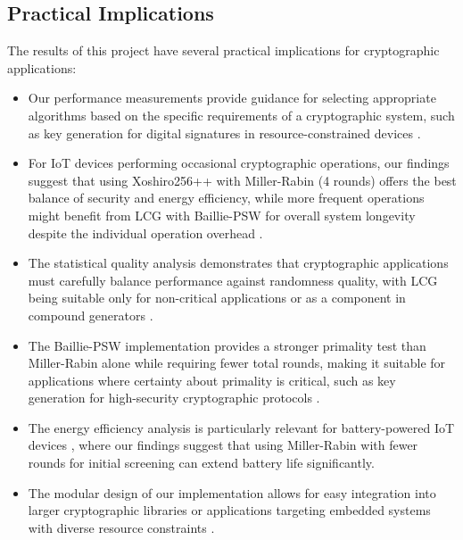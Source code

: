 \subsection{Practical Implications}

The results of this project have several practical implications for cryptographic applications:

\begin{itemize}
    \item Our performance measurements provide guidance for selecting appropriate algorithms based on the specific requirements of a cryptographic system, such as key generation for digital signatures in resource-constrained devices \cite{resource_constrained, embedded_crypto}.
    
    \item For IoT devices performing occasional cryptographic operations, our findings suggest that using Xoshiro256++ with Miller-Rabin (4 rounds) offers the best balance of security and energy efficiency, while more frequent operations might benefit from LCG with Baillie-PSW for overall system longevity despite the individual operation overhead \cite{energy_prng, prime_iot}.
    
    \item The statistical quality analysis demonstrates that cryptographic applications must carefully balance performance against randomness quality, with LCG being suitable only for non-critical applications or as a component in compound generators \cite{lcg_applications, nist_test_suite}.
    
    \item The Baillie-PSW implementation provides a stronger primality test than Miller-Rabin alone while requiring fewer total rounds, making it suitable for applications where certainty about primality is critical, such as key generation for high-security cryptographic protocols \cite{baillie_attacks, pomerance2001}.
    
    \item The energy efficiency analysis is particularly relevant for battery-powered IoT devices \cite{iot_survey}, where our findings suggest that using Miller-Rabin with fewer rounds for initial screening can extend battery life significantly.
    
    \item The modular design of our implementation allows for easy integration into larger cryptographic libraries or applications targeting embedded systems with diverse resource constraints \cite{embedded_benchmarking, embedded_crypto}.
\end{itemize}

